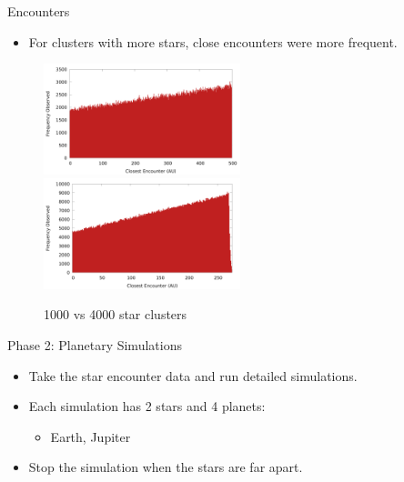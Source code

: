 \documentclass{beamer}
\begin{document}
\begin{frame}{Encounters}
    \begin{itemize}
        \item For clusters with more stars, close encounters were more frequent.
    \end{itemize}
    \begin{figure}
        \centering
        \caption{1000 vs 4000 star clusters}
        \includegraphics[width=2.25in]{encounter_distance_frequency_n1000} \\
        \includegraphics[width=2.25in]{encounter_distance_frequency_n4000}
    \end{figure}
\end{frame}

\begin{frame}{Phase 2: Planetary Simulations}
    \begin{itemize}
        \item Take the star encounter data and run detailed simulations.
        \item Each simulation has 2 stars and 4 planets:
            \begin{itemize}
            \item Earth, Jupiter
            \end{itemize}
        \item Stop the simulation when the stars are far apart.
    \end{itemize}
\end{frame}
\end{document}

